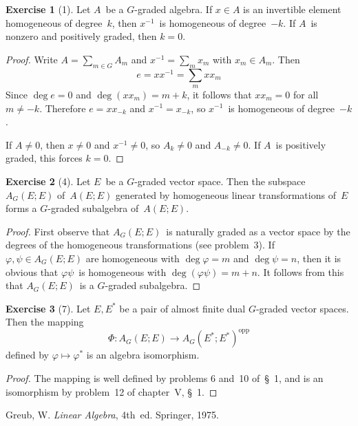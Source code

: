 \documentclass[letterpaper,12pt]{article}
\newcommand{\opp}[1]{#1^{\mathrm{opp}}}
\theoremstyle{definition}
\newtheorem*{exer}{Exercise}
\theoremstyle{remark}
\begin{document}
\begin{exer}[1]
Let \(A\)~be a \(G\)-graded algebra. If \(x\in A\) is an invertible element homogeneous of degree~\(k\), then \(x^{-1}\)~is homogeneous of degree~\(-k\). If \(A\)~is nonzero and positively graded, then \(k=0\).
\end{exer}
\begin{proof}
Write \(A=\sum_{m\in G}A_m\) and \(x^{-1}=\sum_m x_m\) with \(x_m\in A_m\). Then
\[e=xx^{-1}=\sum_m xx_m\]
Since \(\deg e=0\) and \(\deg(xx_m)=m+k\), it follows that \(xx_m=0\) for all \(m\ne-k\). Therefore \(e=xx_{-k}\) and \(x^{-1}=x_{-k}\), so \(x^{-1}\)~is homogeneous of degree~\(-k\).

If \(A\ne 0\), then \(x\ne 0\) and \(x^{-1}\ne 0\), so \(A_k\ne 0\) and \(A_{-k}\ne 0\). If \(A\)~is positively graded, this forces \(k=0\).
\end{proof}

\begin{exer}[4]
Let \(E\)~be a \(G\)-graded vector space. Then the subspace \(A_G(E;E)\) of~\(A(E;E)\) generated by homogeneous linear transformations of~\(E\) forms a \(G\)-graded subalgebra of~\(A(E;E)\).
\end{exer}
\begin{proof}
First observe that \(A_G(E;E)\)~is naturally graded as a vector space by the degrees of the homogeneous transformations (see problem~3).
If \(\varphi,\psi\in A_G(E;E)\) are homogeneous with \(\deg\varphi=m\) and \(\deg\psi=n\), then it is obvious that \(\varphi\psi\)~is homogeneous with \(\deg(\varphi\psi)=m+n\). It follows from this that \(A_G(E;E)\)~is a \(G\)-graded subalgebra.
\end{proof}

\begin{exer}[7]
Let \(E,E^*\) be a pair of almost finite dual \(G\)-graded vector spaces. Then the mapping
\[\Phi:A_G(E;E)\to\opp{A_G(E^*;E^*)}\]
defined by \(\varphi\mapsto\varphi^*\) is an algebra isomorphism.
\end{exer}
\begin{proof}
The mapping is well defined by problems 6 and~10 of~\S~1, and is an isomorphism by problem~12 of chapter~V, \S~1.
\end{proof}

\begin{thebibliography}{0}
 Greub, W. \textit{Linear Algebra}, 4th~ed. Springer, 1975.
\end{thebibliography}
\end{document}
